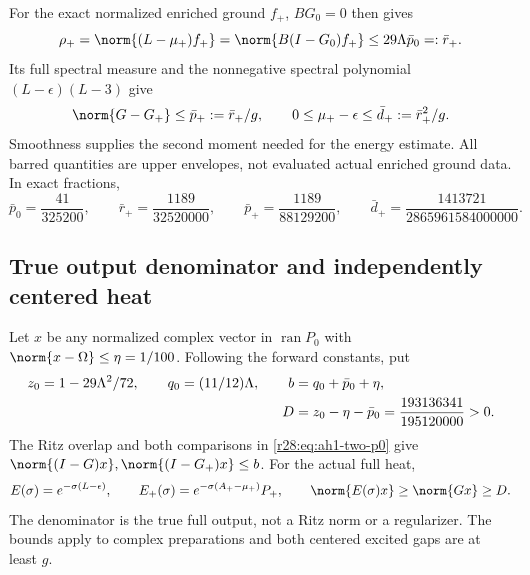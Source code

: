 For the exact normalized enriched ground $f_+$, $BG_0=0$ then gives
\begin{equation}
 \rho_+=\norm{(L-\mu_+)f_+}=\norm{B(I-G_0)f_+}
 \le29\Lambda\bar p_0=:\bar r_+.
\end{equation}
Its full spectral measure and the nonnegative spectral polynomial $(L-\epsilon)(L-3)$ give
\begin{equation}
 \norm{G-G_+}\le\bar p_+:=\bar r_+/g,
 \qquad0\le\mu_+-\epsilon\le\bar d_+:=\bar r_+^2/g.
 \label{r28:eq:ah1-plus-residual}
\end{equation}
Smoothness supplies the second moment needed for the energy estimate. All barred quantities are upper envelopes, not evaluated actual enriched ground data. In exact fractions,
\begin{equation}
 \bar p_0=\frac{41}{325200},\qquad
 \bar r_+=\frac{1189}{32520000},\qquad
 \bar p_+=\frac{1189}{88129200},\qquad
 \bar d_+=\frac{1413721}{2865961584000000}.
\end{equation}

\subsection{True output denominator and independently centered heat}
Let $x$ be any normalized complex vector in $\operatorname{ran}P_0$ with $\norm{x-\Omega}\le\eta=1/100$. Following the forward constants, put
\begin{align}
 z_0=1-29\Lambda^2/72,\qquad q_0=(11/12)\Lambda,\qquad
 b&=q_0+\bar p_0+\eta,\notag\\
 D&=z_0-\eta-\bar p_0=\frac{193136341}{195120000}>0.
 \label{r28:eq:ah1-true-floor}
\end{align}
The Ritz overlap and both comparisons in \eqref{r28:eq:ah1-two-p0} give
$\norm{(I-G)x},\norm{(I-G_+)x}\le b$. For the actual full heat,
\begin{equation}
 E(\sigma)=e^{-\sigma(L-\epsilon)},\qquad
 E_+(\sigma)=e^{-\sigma(A_+-\mu_+)}P_+,
 \qquad\norm{E(\sigma)x}\ge\norm{Gx}\ge D.
 \label{r28:eq:ah1-heats}
\end{equation}
The denominator is the true full output, not a Ritz norm or a regularizer. The bounds apply to complex preparations and both centered excited gaps are at least $g$.

